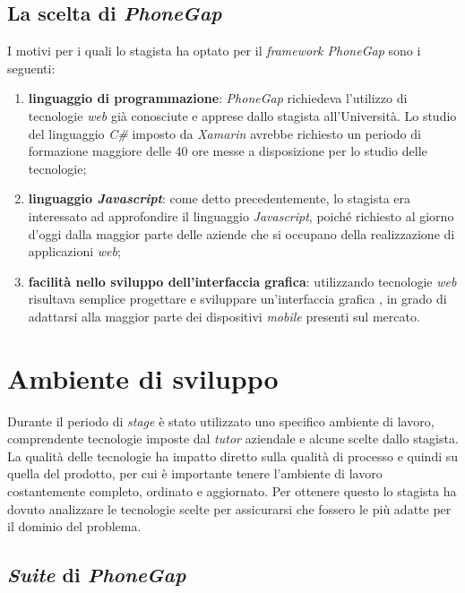 \subsection{La scelta di \textit{PhoneGap}}

I motivi per i quali lo stagista ha optato per il \textit{framework PhoneGap} sono i seguenti:
\begin{enumerate}
	\item \textbf{linguaggio di programmazione}: \textit{PhoneGap} richiedeva l'utilizzo di tecnologie \textit{web} già conosciute e apprese dallo stagista all'Università. Lo studio del linguaggio \textit{C\#} imposto da \textit{Xamarin} avrebbe richiesto un periodo di formazione maggiore delle 40 ore messe a disposizione per lo studio delle tecnologie;
	\item \textbf{linguaggio \textit{Javascript}}: come detto precedentemente, lo stagista era interessato ad approfondire il linguaggio \textit{Javascript}, poiché richiesto al giorno d'oggi dalla maggior parte delle aziende che si occupano della realizzazione di applicazioni \textit{web};
	\item \textbf{facilità nello sviluppo dell'interfaccia grafica}: utilizzando tecnologie \textit{web} risultava semplice progettare e sviluppare un'interfaccia grafica , in grado di adattarsi alla maggior parte dei dispositivi \textit{mobile} presenti sul mercato.
\end{enumerate}

\section{Ambiente di sviluppo}

Durante il periodo di \textit{stage} è stato utilizzato uno specifico ambiente di lavoro, comprendente tecnologie imposte dal \textit{tutor} aziendale e alcune scelte dallo stagista. La qualità delle tecnologie ha impatto diretto sulla qualità di processo e quindi su quella del prodotto, per cui è importante tenere l'ambiente di lavoro costantemente completo, ordinato e aggiornato. Per ottenere questo lo stagista ha dovuto analizzare le tecnologie scelte per assicurarsi che fossero le più adatte per il dominio del problema.

\subsection{\textit{Suite} di \textit{PhoneGap}}

